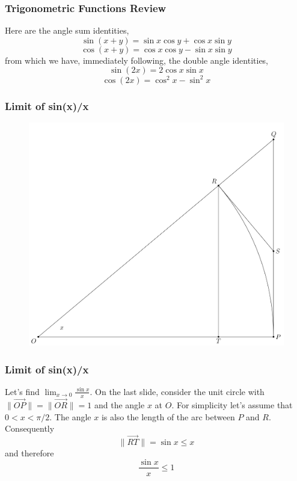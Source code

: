 \documentclass[xcolor=dvipsnames]{beamer}
\begin{document}
\begin{frame}
  \frametitle{Trigonometric Functions Review}
  Here are the angle sum identities,
  \begin{equation}
  \label{eq:eitaiquu}
  \sin(x+y)=\sin{}x\cos{}y+\cos{}x\sin{}y
\end{equation}
\begin{equation}
  \label{eq:iasoojou}
  \cos(x+y)=\cos{}x\cos{}y-\sin{}x\sin{}y
\end{equation}
from which we have, immediately following, the double angle
identities,
  \begin{equation}
    \label{eq:icuchodo}
    \sin(2x)=2\cos{}x\sin{}x
  \end{equation}
  \begin{equation}
    \label{eq:woojahtu}
    \cos(2x)=\cos^{2}x-\sin^{2}x
  \end{equation}
\end{frame}

\begin{frame}
  \frametitle{Limit of sin(x)/x}
\begin{figure}[h]
\includegraphics[scale=.24]{./diagrams/limsinxoverx.png}
\end{figure}
\end{frame}

\begin{frame}
  \frametitle{Limit of sin(x)/x}
  Let's find $\lim_{x\rightarrow{}0}\frac{\sin{}x}{x}$. On the last slide, consider the unit circle with
  $\|\vec{OP}\|=\|\vec{OR}\|=1$ and the angle $x$ at $O$. For simplicity let's
  assume that $0<x<\pi/2$. The angle $x$ is also the length of the arc
  between $P$ and $R$. Consequently
  \begin{equation}
    \label{eq:iufoobue}
\|\vec{RT}\|=\sin{}x\leq{}x    
  \end{equation}
  and therefore
  \begin{equation}
    \label{eq:chaveeju}
    \frac{\sin{}x}{x}\leq{}1
  \end{equation}
\end{frame}
\end{document}
